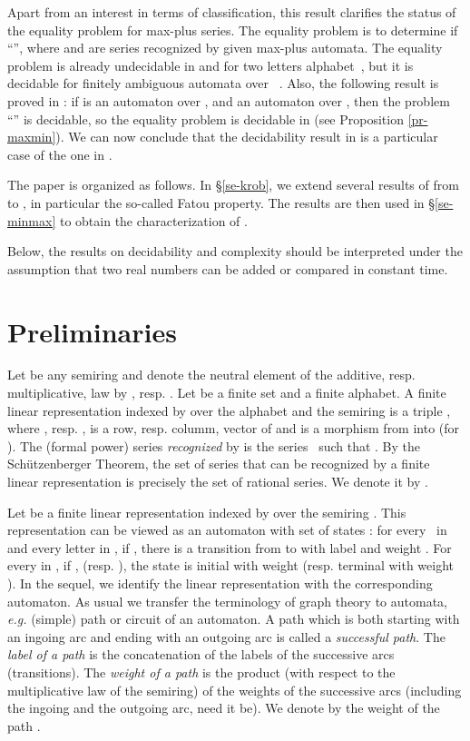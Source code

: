 \documentclass{article}
\newcommand{\1}{\mathbb{1}}
\newcommand{\0}{\mathbb{0}}
\begin{document}
Apart from an interest in terms of classification, this result 
clarifies the status of the equality problem for 
max-plus series. The equality problem is to determine if ``'',
where  and  are series recognized by given max-plus
automata. The equality problem is already undecidable in  and
for two letters alphabet~\cite{krob}, but it is decidable for
finitely ambiguous automata over ~\cite{HIJi,webe94}. Also, the following result
is proved in \cite{krob94}: if  is an automaton over , and
 an automaton over , then the problem ``'' is
decidable, so the equality problem is decidable 
in  (see Proposition \ref{pr-maxmin}). We can now
conclude that the decidability result in \cite{krob94} is a particular
case of the one in \cite{HIJi,webe94}. 

\medskip

The paper is organized as follows. In \S \ref{se-krob}, we extend several
results of \cite{krob94} from  to , in particular the
so-called Fatou property. The
results are then used in \S \ref{se-minmax} to obtain the characterization of
. 

\medskip

Below, the results on decidability and
complexity should be interpreted under the assumption that two real
numbers can be added or compared in constant time. 

\section{Preliminaries}\label{se-prel}


Let  be any semiring and denote the neutral element of
the additive, resp. multiplicative, law by ,
resp. . 
Let  be a finite set and  a finite alphabet.
A finite linear representation indexed by  over the alphabet 
and the semiring 
is a triple , where
, resp. , is a row, resp. columm, vector
of  and  is a morphism from  into 
(for ).
The (formal power) series {\it recognized} by  is the
series~ such that .
By the Sch\"{u}tzenberger
Theorem, the set of series that can be
recognized by a finite linear representation is precisely the set of
rational series. We denote it by .

\medskip

Let  be a finite linear representation indexed by 
over the semiring . This representation can be viewed as an automaton
with set of states :
for every~ in  and every letter  in
, if , there is a transition from  to 
with label  and weight . For every  in ,
if , (resp. ),
the state  is initial with weight  (resp. terminal
with weight ). In the sequel, we identify the linear representation
with the corresponding automaton.
As usual we transfer the terminology of graph theory to automata, {\it e.g.}
(simple) path or circuit of an automaton. A path which is both starting with an ingoing arc and 
ending with an outgoing arc is called a {\em successful path}.  
The {\em label of a path} is the concatenation of the labels of the
successive arcs (transitions). The {\em weight of a 
  path} is the product (with respect to the multiplicative law of the
semiring) of the weights of the successive 
arcs (including the ingoing and the outgoing arc, need it be).
We denote by  the weight of the path .
\end{document}
